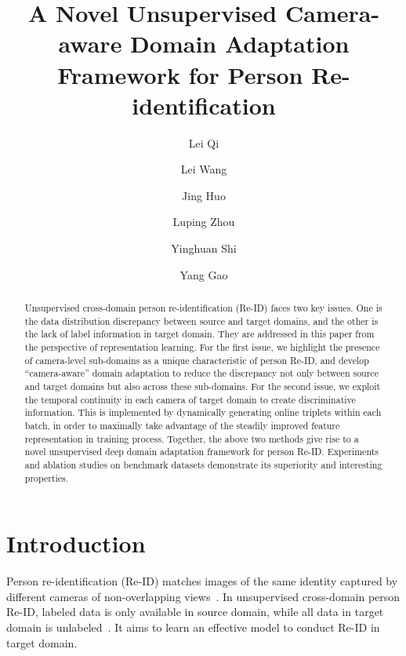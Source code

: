 \documentclass[10pt,twocolumn,letterpaper]{article}
\begin{document}
 
\title{A Novel Unsupervised Camera-aware Domain Adaptation Framework for Person Re-identification}
 
\author[1]{Lei Qi}
\author[2$^*$]{Lei Wang}
\author[1]{Jing Huo}
\author[3]{Luping Zhou}
\author[1]{Yinghuan Shi}
\author[1\thanks{Corresponding authors: Yang Gao; Lei Wang. The work of J. Huo was supported by NSFC (61806092) and Jiangsu Natural Science Foundation (BK20180326). The work of Y. Shi was supported by the Fundamental Research Funds for the Central Universities (020214380056), NSFC (61673203), CCF-Tencent Open Research Fund (RAGR20180114). The work of Y. Gao was supported by NSFC (61432008).}]{Yang Gao}
 
 
 
\maketitle


 
\begin{abstract}
Unsupervised cross-domain person re-identification (Re-ID) faces two key issues. One is the data distribution discrepancy between source and target domains, and the other is the lack of label information in target domain. They are addressed in this paper from the perspective of representation learning. 
For the first issue, we highlight the presence of camera-level sub-domains as a unique characteristic of person Re-ID, and develop ``camera-aware'' domain adaptation to reduce the discrepancy not only between source and target domains but also across these sub-domains.
For the second issue, we exploit the temporal continuity in each camera of target domain to create discriminative information. This is implemented by dynamically generating online triplets within each batch, in order to maximally take advantage of the steadily improved feature representation in training process. Together, the above two methods give rise to a novel unsupervised deep domain adaptation framework for person Re-ID. Experiments and ablation studies on benchmark datasets demonstrate its superiority and interesting properties.
\end{abstract}
 
\vspace{-15pt}
\section{Introduction}
Person re-identification (Re-ID) matches images of the same identity captured by different cameras of non-overlapping views~\cite{DBLP:journals/tmm/ChenLLCH11}. In unsupervised cross-domain person Re-ID, labeled data is only available in source domain, while all data in target domain is unlabeled~\cite{qi2018unsupervised}. 
It aims to learn an effective model to conduct Re-ID in target domain.
\end{document}
